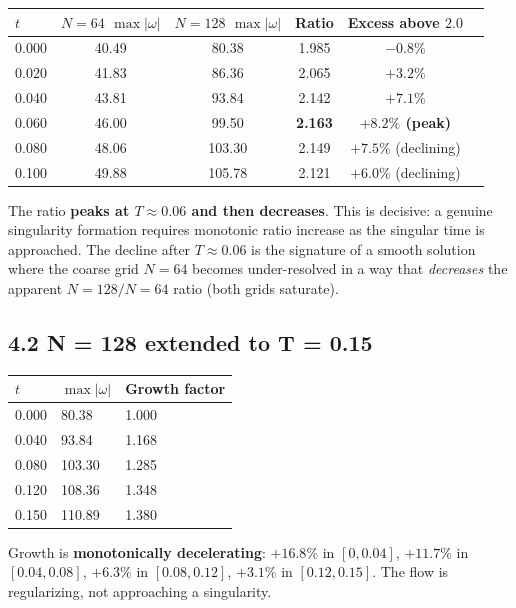 \documentclass[11pt]{article}
\begin{document}
\begin{table}[h]
\centering
\begin{tabular}{lccccc}
\toprule
\(t\) & \(N=64\) \(\max|\omega|\) & \(N=128\) \(\max|\omega|\) & Ratio & Excess above \(2.0\) \\
\midrule
0.000 & 40.49 & 80.38 & 1.985 & \(-0.8\%\) \\
0.020 & 41.83 & 86.36 & 2.065 & \(+3.2\%\) \\
0.040 & 43.81 & 93.84 & 2.142 & \(+7.1\%\) \\
0.060 & 46.00 & 99.50 & \textbf{2.163} & \textbf{\(+8.2\%\) (peak)} \\
0.080 & 48.06 & 103.30 & 2.149 & \(+7.5\%\) (declining) \\
0.100 & 49.88 & 105.78 & 2.121 & \(+6.0\%\) (declining) \\
\bottomrule
\end{tabular}
\end{table}


The ratio \textbf{peaks at \(T \approx 0.06\) and then decreases}. This is
decisive: a genuine singularity formation requires monotonic ratio
increase as the singular time is approached. The decline after
\(T \approx 0.06\) is the signature of a smooth solution where the coarse
grid \(N = 64\) becomes under-resolved in a way that \textit{decreases} the
apparent \(N=128/N=64\) ratio (both grids saturate).


\subsection*{4.2 N = 128 extended to T = 0.15}

\begin{table}[h]
\centering
\begin{tabular}{lll}
\toprule
\(t\) & \(\max|\omega|\) & Growth factor \\
\midrule
0.000 & 80.38 & 1.000 \\
0.040 & 93.84 & 1.168 \\
0.080 & 103.30 & 1.285 \\
0.120 & 108.36 & 1.348 \\
0.150 & 110.89 & 1.380 \\
\bottomrule
\end{tabular}
\end{table}


Growth is \textbf{monotonically decelerating}: \(+16.8\%\) in \([0, 0.04]\),
\(+11.7\%\) in \([0.04, 0.08]\), \(+6.3\%\) in \([0.08, 0.12]\), \(+3.1\%\) in
\([0.12, 0.15]\). The flow is regularizing, not approaching a singularity.
\end{document}
